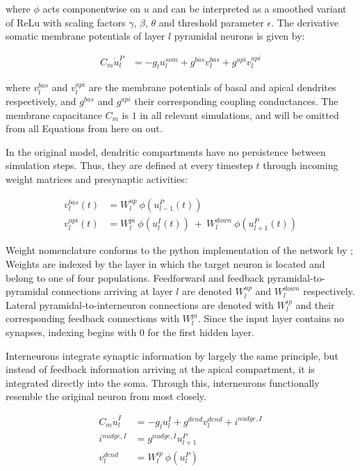 where $\phi$ acts componentwise on $u$ and can be interpreted as a smoothed variant of ReLu  with scaling
factors $\gamma$, $\beta$, $\theta$ and threshold parameter $\epsilon$. The derivative somatic membrane potentials of
layer $l$ pyramidal neurons is given by:

\begin{align}
  C_m \dot{u}_l^P & = - g_l u_l^{som} + g^{bas} v_l^{bas} + g^{api} v_l^{api} \label{eq-pyr-dynamics-rate}
\end{align}

where $v_l^{bas}$ and $v_l^{api}$ are the membrane potentials of basal and apical dendrites respectively, and $g^{bas}$
and $g^{api}$ their corresponding coupling conductances. The membrane capacitance $C_m$ is $1$ in all relevant
simulations, and will be omitted from all Equations from here on out.


In the original model, dendritic compartments have no persistence between simulation steps. Thus, they are defined at
every timestep $t$ through incoming weight matrices and presynaptic activities:

\begin{align}
  v_l^{bas}(t) & = W_l^{up} \ \phi(u_{l-1}^P(t)) \label{eq-v-bas-rate}                                     \\
  v_l^{api}(t) & =  W_l^{pi} \ \phi(u_l^I(t)) \ + \  W_l^{down} \ \phi(u_{l+1}^P(t)) \label{eq-v-api-rate}
\end{align}

Weight nomenclature conforms to the python implementation of the network by \cite{Haider2021}; Weights are indexed by
the layer in which the target neuron is located and belong to one of four populations. Feedforward and feedback
pyramidal-to-pyramidal connections arriving at layer $l$ are denoted $W_l^{up}$ and $W_l^{down}$ respectively. Lateral
pyramidal-to-interneuron connections are denoted with $W_l^{ip}$ and their corresponding feedback connections with
$W_l^{pi}$. Since the input layer contains no synapses, indexing begins with $0$ for the first hidden layer. \newline

Interneurons integrate synaptic information by largely the same principle, but instead of feedback information arriving
at the apical compartment, it is integrated directly into the soma. Through this, interneurons functionally resemble the
original neuron from \cite{urbanczik2014learning} most closely.

\begin{align}
  C_m \dot{u}_l^I & = - g_l u_l^{I} + g^{dend} v_l^{dend} + i^{nudge, I}\label{eq-intn-dynamics} \\
  i^{nudge, I}    & = g^{nudge, I} u_{l+1}^P                                                     \\
  v_l^{dend}      & = W_l^{ip} \ \phi(u_{l}^P)
\end{align}

